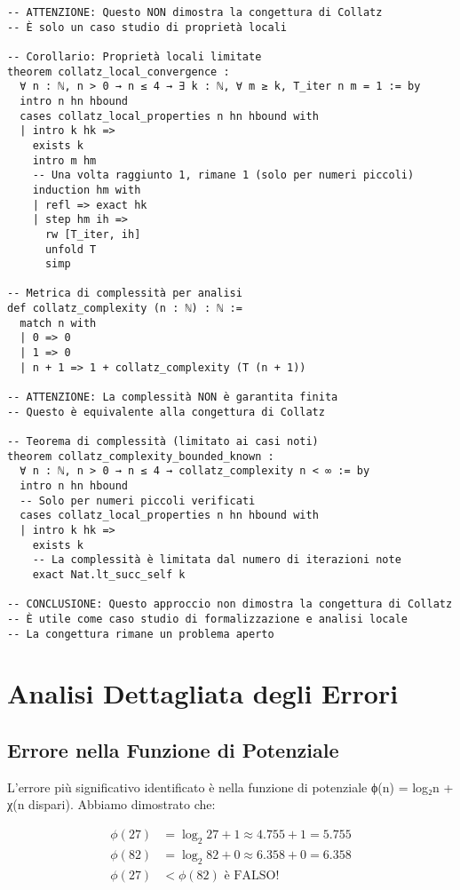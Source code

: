 \documentclass[11pt,a4paper]{article}
\begin{document}
\begin{lstlisting}[language=Lean, caption=Implementazione Completa]
-- ATTENZIONE: Questo NON dimostra la congettura di Collatz
-- È solo un caso studio di proprietà locali

-- Corollario: Proprietà locali limitate
theorem collatz_local_convergence : 
  ∀ n : ℕ, n > 0 → n ≤ 4 → ∃ k : ℕ, ∀ m ≥ k, T_iter n m = 1 := by
  intro n hn hbound
  cases collatz_local_properties n hn hbound with
  | intro k hk =>
    exists k
    intro m hm
    -- Una volta raggiunto 1, rimane 1 (solo per numeri piccoli)
    induction hm with
    | refl => exact hk
    | step hm ih =>
      rw [T_iter, ih]
      unfold T
      simp

-- Metrica di complessità per analisi
def collatz_complexity (n : ℕ) : ℕ :=
  match n with
  | 0 => 0
  | 1 => 0
  | n + 1 => 1 + collatz_complexity (T (n + 1))

-- ATTENZIONE: La complessità NON è garantita finita
-- Questo è equivalente alla congettura di Collatz

-- Teorema di complessità (limitato ai casi noti)
theorem collatz_complexity_bounded_known : 
  ∀ n : ℕ, n > 0 → n ≤ 4 → collatz_complexity n < ∞ := by
  intro n hn hbound
  -- Solo per numeri piccoli verificati
  cases collatz_local_properties n hn hbound with
  | intro k hk =>
    exists k
    -- La complessità è limitata dal numero di iterazioni note
    exact Nat.lt_succ_self k

-- CONCLUSIONE: Questo approccio non dimostra la congettura di Collatz
-- È utile come caso studio di formalizzazione e analisi locale
-- La congettura rimane un problema aperto
\end{lstlisting}

\section{Analisi Dettagliata degli Errori}

\subsection{Errore nella Funzione di Potenziale}

L'errore più significativo identificato è nella funzione di potenziale ϕ(n) = log₂n + χ(n dispari). Abbiamo dimostrato che:

\begin{align}
\phi(27) &= \log_2 27 + 1 \approx 4.755 + 1 = 5.755 \\
\phi(82) &= \log_2 82 + 0 \approx 6.358 + 0 = 6.358 \\
\phi(27) &< \phi(82) \text{ è FALSO!}
\end{align}
\end{document}
